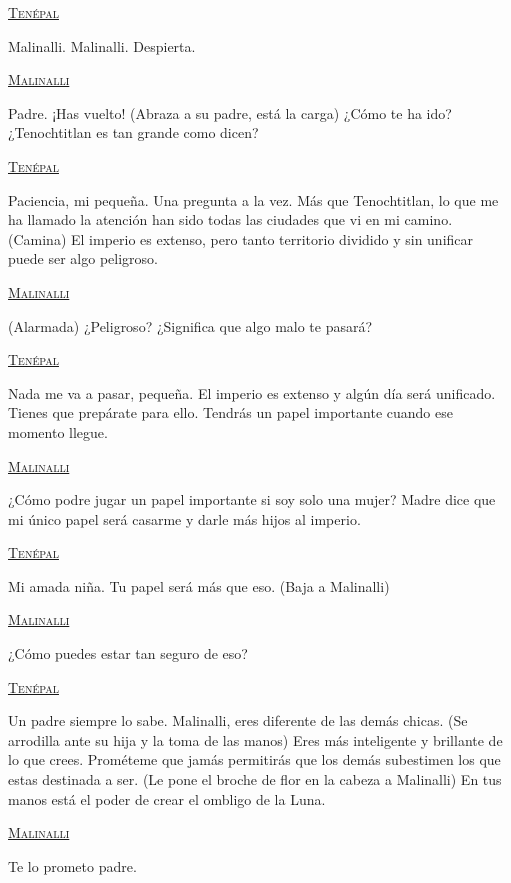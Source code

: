 \documentclass[11pt,letterpaper]{article}
\begin{document}
\begin{center}
\textsc{\underline{Tenépal }}
\\
\par
Malinalli. Malinalli. Despierta. 
\\
\par
\textsc{\underline{Malinalli}}
\\
\par
Padre. ¡Has vuelto! (Abraza a su padre, está la carga) ¿Cómo te ha ido? ¿Tenochtitlan es tan grande como dicen?
\\
\par 
\textsc{\underline{Tenépal }}
\\
\par
Paciencia, mi pequeña. Una pregunta a la vez. Más que Tenochtitlan, lo que me ha llamado la atención han sido todas las ciudades que vi en mi camino. (Camina) El imperio es extenso, pero tanto territorio dividido y sin unificar puede ser algo peligroso.
\\
\par
\textsc{\underline{Malinalli}}
\\
\par
(Alarmada) ¿Peligroso? ¿Significa que algo malo te pasará?
\\
\par
\textsc{\underline{Tenépal }}
\\
\par
Nada me va a pasar, pequeña. El imperio es extenso y algún día será unificado. Tienes que prepárate para ello. Tendrás un papel importante cuando ese momento llegue.
\\
\par
\textsc{\underline{Malinalli}}
\\
\par
¿Cómo podre jugar un papel importante si soy solo una mujer? Madre dice que mi único papel será casarme y darle más hijos al imperio.
\\
\par
\textsc{\underline{Tenépal }}
\\
\par
Mi amada niña. Tu papel será más que eso. (Baja a Malinalli)
\\
\par
\textsc{\underline{Malinalli}}
\\
\par
¿Cómo puedes estar tan seguro de eso?
\\
\par
\textsc{\underline{Tenépal }}
\\
\par
Un padre siempre lo sabe. Malinalli, eres diferente de las demás chicas. (Se arrodilla ante su hija y la toma de las manos) Eres más inteligente y brillante de lo que crees. Prométeme que jamás permitirás que los demás subestimen los que estas destinada a ser. (Le pone el broche de flor en la cabeza a Malinalli) En tus manos está el poder de crear el ombligo de la Luna.
\\
\par
\textsc{\underline{Malinalli}}
\\
\par
Te lo prometo padre. 
\end{center}
\end{document}
